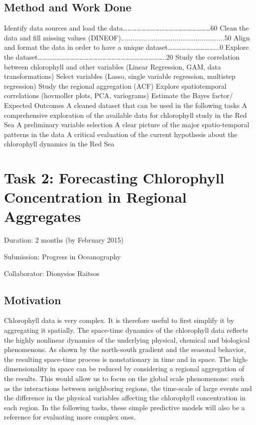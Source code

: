 \subsection{Method and Work Done}

Identify data sources and load the data…………………………………………………60%
Clean the data and fill missing values (DINEOF)......................................................50%
Align and format the data in order to have a unique dataset…………………………...0%
Explore the dataset………………………………………………………………………..20%
Study the correlation between chlorophyll and other variables (Linear Regression, GAM, data transformations)
Select variables (Lasso, single variable regression, multistep regression)
Study the regional aggregation (ACF)
Explore spatiotemporal correlations (hovmoller plots, PCA, variograms)
Estimate the Bayes factor/ %
Expected Outcomes
A cleaned dataset that can be used in the following tasks
A comprehensive exploration of the available data for chlorophyll study in the Red Sea
A preliminary variable selection
A clear picture of the major spatio-temporal patterns in the data
A critical evaluation of the current hypothesis about the chlorophyll dynamics in the Red Sea


\section{Task 2:  Forecasting Chlorophyll Concentration in Regional Aggregates}

Duration: 2 months (by February 2015)

Submission: Progress in Oceanography

Collaborator: Dionysios Raitsos

\subsection{Motivation}

Chlorophyll data is very complex. It is therefore useful to first simplify it by aggregating it spatially. The space-time dynamics of the chlorophyll data reflects the highly nonlinear dynamics of the underlying physical, chemical and biological phenomenons. As shown by the north-south gradient and the seasonal behavior, the resulting space-time process is nonstationary in time and in space. The high-dimensionality in space can be reduced by considering a regional aggregation of the results. This would allow us to focus on the global scale phenomenons: such as the interactions between neighboring regions, the time-scale of large events and the difference in the physical variables affecting the chlorophyll concentration in each region. In the following tasks, these simple predictive models will also be a reference for evaluating more complex ones. 

